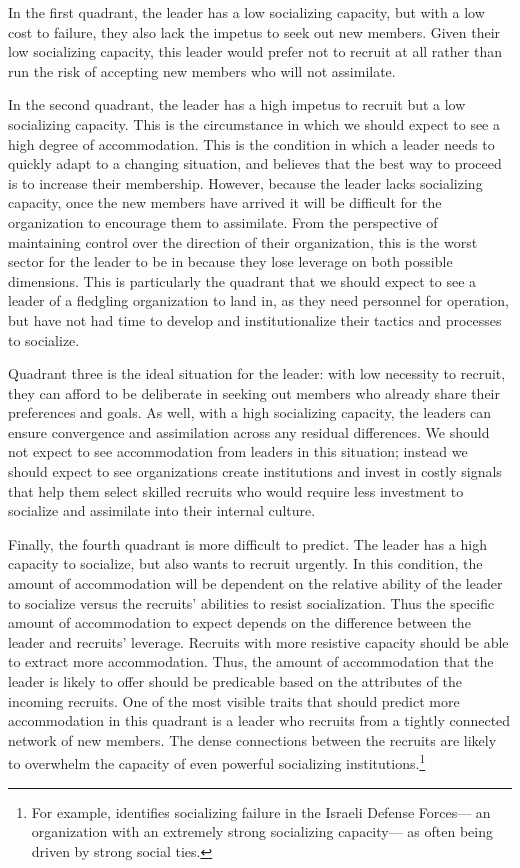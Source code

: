 In the first quadrant, the leader has a low socializing capacity, but with a low cost to failure, they also lack the impetus to seek out new members. Given their low socializing capacity, this leader would prefer not to recruit at all rather than run the risk of accepting new members who will not assimilate. 

In the second quadrant, the leader has a high impetus to recruit but a low socializing capacity. This is the circumstance in which we should expect to see a high degree of accommodation. This is the condition in which a leader needs to quickly adapt to a changing situation, and believes that the best way to proceed is to increase their membership.  However, because the leader lacks socializing capacity, once the new members have arrived it will be difficult for the organization to encourage them to assimilate. From the perspective of maintaining control over the direction of their organization, this is the worst sector for the leader to be in because they lose leverage on both possible dimensions. This is particularly the quadrant that we should expect to see a leader of a fledgling organization to land in, as  they need personnel for operation, but have not had time to develop and institutionalize their tactics and processes to socialize.

Quadrant three is the ideal situation for the leader: with low necessity to recruit, they can afford to be deliberate in seeking out members who already share their preferences and goals. As well, with a high socializing capacity, the leaders can ensure convergence and assimilation across any residual differences.  We should not expect to see accommodation from leaders in this situation; instead we should expect to see organizations create institutions and invest in costly signals that help them select skilled recruits who would require less investment to socialize and assimilate into their internal culture. 

Finally, the fourth quadrant is more difficult to predict. The leader has a high capacity to socialize, but also wants to recruit urgently. In this condition, the amount of accommodation will be dependent on the relative ability of the leader to socialize versus the recruits' abilities to resist socialization. Thus the specific amount of accommodation to expect depends on the difference between the leader and recruits' leverage. Recruits with more resistive capacity should be able to extract more accommodation. Thus, the amount of accommodation that the leader is likely to offer should be predicable based on the attributes of the incoming recruits. One of the most visible traits that should predict more accommodation in this quadrant is a leader who recruits from a tightly connected network of new members. The dense connections between the recruits are likely to overwhelm the capacity of even powerful socializing institutions.\footnote{For example, \cite{manekin2017limits} identifies socializing failure in the Israeli Defense Forces--- an organization with an extremely strong socializing capacity--- as often being driven by strong social ties.}


